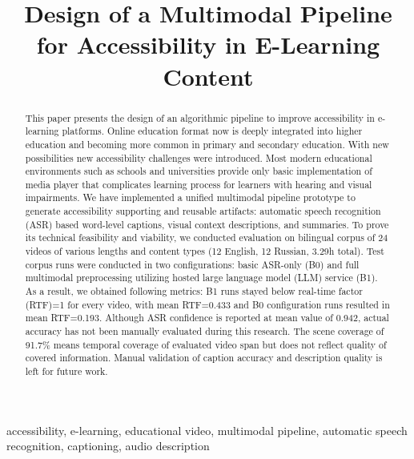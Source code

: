 \documentclass[conference]{IEEEtran}
\begin{document}
\title{Design of a Multimodal Pipeline for Accessibility in E-Learning Content}

\author{}

\maketitle

\begin{abstract}
This paper presents the design of an algorithmic pipeline to improve accessibility in e-learning platforms. Online education format now is deeply integrated into higher education and becoming more common in primary and secondary education. With new possibilities new accessibility challenges were introduced. Most modern educational environments such as schools and universities provide only basic implementation of media player that complicates learning process for learners with hearing and visual impairments. We have implemented a unified multimodal pipeline prototype to generate accessibility supporting and reusable artifacts: automatic speech recognition (ASR) based word-level captions, visual context descriptions, and summaries. To prove its technical feasibility and viability, we conducted evaluation on bilingual corpus of 24 videos of various lengths and content types (12 English, 12 Russian, 3.29h total). Test corpus runs were conducted in two configurations: basic ASR-only (B0) and full multimodal preprocessing utilizing hosted large language model (LLM) service (B1). As a result, we obtained following metrics: B1 runs stayed below real-time factor (RTF)=1 for every video, with mean RTF=0.433 and B0 configuration runs resulted in mean RTF=0.193. Although ASR confidence is reported at mean value of 0.942, actual accuracy has not been manually evaluated during this research. The scene coverage of 91.7\% means temporal coverage of evaluated video span but does not reflect quality of covered information. Manual validation of caption accuracy and description quality is left for future work.
\end{abstract}

\begin{IEEEkeywords}
accessibility, e-learning, educational video, multimodal pipeline, automatic speech recognition, captioning, audio description
\end{IEEEkeywords}
\end{document}
